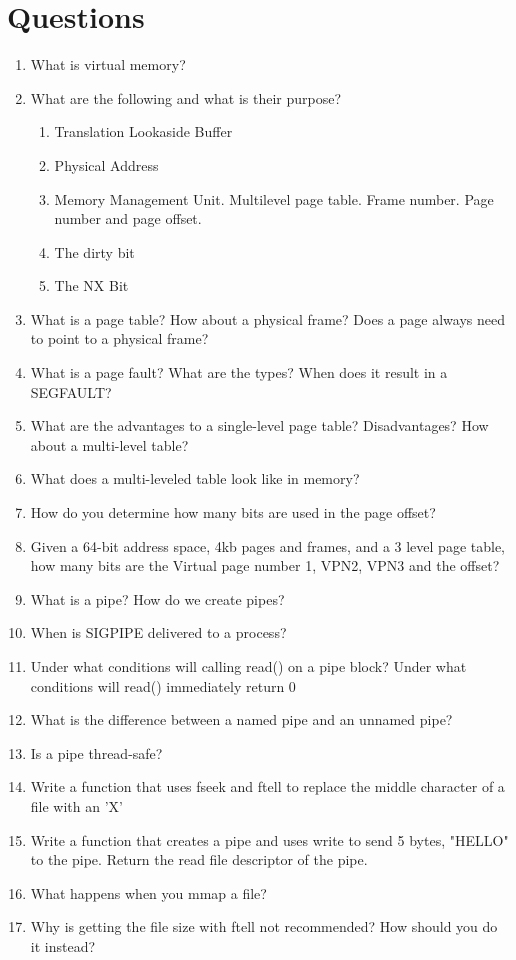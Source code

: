 \section{Questions}
	 
\begin{enumerate}
	\item What is virtual memory?
	\item What are the following and what is their purpose?
	      \begin{enumerate}
	      	\item Translation Lookaside Buffer
	      	\item Physical Address
	      	\item Memory Management Unit. Multilevel page table. Frame number. Page number and page offset.
	      	\item The dirty bit
	      	\item The NX Bit
	      \end{enumerate}
	\item What is a page table? How about a physical frame? Does a page always need to point to a physical frame?
	\item What is a page fault? What are the types? When does it result in a SEGFAULT?
	\item What are the advantages to a single-level page table? Disadvantages? How about a multi-level table?
	\item What does a multi-leveled table look like in memory?
	\item How do you determine how many bits are used in the page offset?
	\item Given a 64-bit address space, 4kb pages and frames, and a 3 level page table, how many bits are the Virtual page number 1, VPN2, VPN3 and the offset?
	\item What is a pipe? How do we create pipes?
	\item When is SIGPIPE delivered to a process?
	\item Under what conditions will calling read() on a pipe block? Under what conditions will read() immediately return 0
	\item What is the difference between a named pipe and an unnamed pipe?
	\item Is a pipe thread-safe?
	\item Write a function that uses fseek and ftell to replace the middle character of a file with an 'X'
	\item Write a function that creates a pipe and uses write to send 5 bytes, "HELLO" to the pipe. Return the read file descriptor of the pipe.
	\item What happens when you mmap a file?
	\item Why is getting the file size with ftell not recommended? How should you do it instead?
\end{enumerate}
	 


